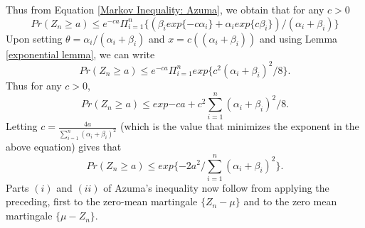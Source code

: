 \documentclass[a4paper,10pt]{article}
\theoremstyle{plain}
\theoremstyle{definition}
\theoremstyle{remark}
\begin{document}
Thus from Equation \ref{Markov Inequality: Azuma}, we obtain that for any $c>0$
\begin{equation}
\label{Azuma1}
Pr(Z_n \geq a ) \leq e^{-ca}\Pi_{i=1}^{n}\{(\beta_i exp\{-c\alpha_i\}+\alpha_i exp\{c\beta_i\})/(\alpha_i+\beta_i)\}
\end{equation}
Upon setting $\theta =\alpha_i/(\alpha_i+\beta_i)$ and $x=c((\alpha_i+\beta_i))$ and using Lemma \ref{exponential lemma}, we can write
\begin{equation*}
Pr(Z_n \geq a) \leq e^{-ca}\Pi_{i=1}^{n}exp\{c^2(\alpha_i+\beta_i)^2/8\}.
\end{equation*}
Thus for any $c>0$,
\begin{equation*}
Pr(Z_n \geq a) \leq exp{-ca+c^2\sum_{i=1}^{n}(\alpha_i+\beta_i)^2/8}.
\end{equation*}
Letting $c=\frac{4a}{\sum_{i=1}^n(\alpha_i+\beta_i)^2}$ (which is the value that minimizes the exponent in the above equation) gives that
\begin{equation*}
Pr(Z_n \geq a) \leq exp\{-2a^2/\sum_{i=1}^n(\alpha_i+\beta_i)^2\}.
\end{equation*}
Parts $(i)$ and $(ii)$ of Azuma's inequality now follow from applying the preceding, first to the zero-mean martingale $\{Z_n-\mu\}$ and to the zero mean martingale $\{\mu-Z_n\}$.
\end{document}
